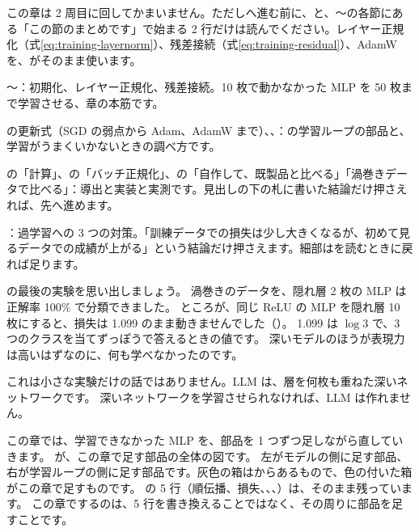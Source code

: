 \begin{readingguide}
\item[\rgpre] この章は 2 周目に回してかまいません。ただしへ進む前に、と、〜の各節にある「この節のまとめです」で始まる 2 行だけは読んでください。レイヤー正規化（式\eqref{eq:training-layernorm}）、残差接続（式\eqref{eq:training-residual}）、AdamW を、がそのまま使います。
\item[\rgmust] 〜：初期化、レイヤー正規化、残差接続。10 枚で動かなかった MLP を 50 枚まで学習させる、章の本筋です。
\item[\rgmust] の更新式（SGD の弱点から Adam、AdamW まで）、、：の学習ループの部品と、学習がうまくいかないときの調べ方です。
\item[\rgskim] の「計算」、の「バッチ正規化」、の「自作して、既製品と比べる」「渦巻きデータで比べる」：導出と実装と実測です。見出しの下の札に書いた結論だけ押さえれば、先へ進めます。
\item[\rgskim] ：過学習への 3 つの対策。「訓練データでの損失は少し大きくなるが、初めて見るデータでの成績が上がる」という結論だけ押さえます。細部はを読むときに戻れば足ります。
\end{readingguide}

の最後の実験を思い出しましょう。
渦巻きのデータを、隠れ層 2 枚の MLP は正解率 100\% で分類できました。
ところが、同じ ReLU の MLP を隠れ層 10 枚にすると、損失は 1.099 のまま動きませんでした（）。
1.099 は $\log 3$ で、3 つのクラスを当てずっぽうで答えるときの値です。
深いモデルのほうが表現力は高いはずなのに、何も学べなかったのです。

これは小さな実験だけの話ではありません。LLM は、層を何枚も重ねた深いネットワークです。
深いネットワークを学習させられなければ、LLM は作れません。

この章では、学習できなかった MLP を、部品を 1 つずつ足しながら直していきます。
が、この章で足す部品の全体の図です。
左がモデルの側に足す部品、右が学習ループの側に足す部品です。灰色の箱はからあるもので、色の付いた箱がこの章で足すものです。
の 5 行（順伝播、損失、、、）は、そのまま残っています。
この章でするのは、5 行を書き換えることではなく、その周りに部品を足すことです。

